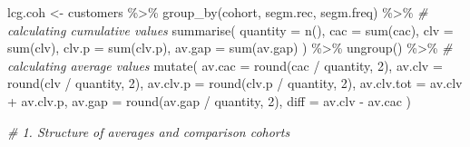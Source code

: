 \documentclass[
]{book}
\newenvironment{Shaded}{\begin{snugshade}}{\end{snugshade}}
\newcommand{\AttributeTok}[1]{\textcolor[rgb]{0.77,0.63,0.00}{#1}}
\newcommand{\CommentTok}[1]{\textcolor[rgb]{0.56,0.35,0.01}{\textit{#1}}}
\newcommand{\DecValTok}[1]{\textcolor[rgb]{0.00,0.00,0.81}{#1}}
\newcommand{\FunctionTok}[1]{\textcolor[rgb]{0.00,0.00,0.00}{#1}}
\newcommand{\NormalTok}[1]{#1}
\newcommand{\OtherTok}[1]{\textcolor[rgb]{0.56,0.35,0.01}{#1}}
\newcommand{\SpecialCharTok}[1]{\textcolor[rgb]{0.00,0.00,0.00}{#1}}
\begin{document}
\begin{Shaded}
\begin{Highlighting}[]
\NormalTok{lcg.coh }\OtherTok{\textless{}{-}}\NormalTok{ customers }\SpecialCharTok{\%\textgreater{}\%}
    \FunctionTok{group\_by}\NormalTok{(cohort, segm.rec, segm.freq) }\SpecialCharTok{\%\textgreater{}\%}
    \CommentTok{\# calculating cumulative values}
    \FunctionTok{summarise}\NormalTok{(}
        \AttributeTok{quantity =} \FunctionTok{n}\NormalTok{(),}
        \AttributeTok{cac =} \FunctionTok{sum}\NormalTok{(cac),}
        \AttributeTok{clv =} \FunctionTok{sum}\NormalTok{(clv),}
        \AttributeTok{clv.p =} \FunctionTok{sum}\NormalTok{(clv.p),}
        \AttributeTok{av.gap =} \FunctionTok{sum}\NormalTok{(av.gap)}
\NormalTok{    ) }\SpecialCharTok{\%\textgreater{}\%}
    \FunctionTok{ungroup}\NormalTok{() }\SpecialCharTok{\%\textgreater{}\%}
    \CommentTok{\# calculating average values}
    \FunctionTok{mutate}\NormalTok{(}
        \AttributeTok{av.cac =} \FunctionTok{round}\NormalTok{(cac }\SpecialCharTok{/}\NormalTok{ quantity, }\DecValTok{2}\NormalTok{),}
        \AttributeTok{av.clv =} \FunctionTok{round}\NormalTok{(clv }\SpecialCharTok{/}\NormalTok{ quantity, }\DecValTok{2}\NormalTok{),}
        \AttributeTok{av.clv.p =} \FunctionTok{round}\NormalTok{(clv.p }\SpecialCharTok{/}\NormalTok{ quantity, }\DecValTok{2}\NormalTok{),}
        \AttributeTok{av.clv.tot =}\NormalTok{ av.clv }\SpecialCharTok{+}\NormalTok{ av.clv.p,}
        \AttributeTok{av.gap =} \FunctionTok{round}\NormalTok{(av.gap }\SpecialCharTok{/}\NormalTok{ quantity, }\DecValTok{2}\NormalTok{),}
        \AttributeTok{diff =}\NormalTok{ av.clv }\SpecialCharTok{{-}}\NormalTok{ av.cac}
\NormalTok{    )}

\CommentTok{\# 1. Structure of averages and comparison cohorts}


\end{Highlighting}
\end{Shaded}
\end{document}
